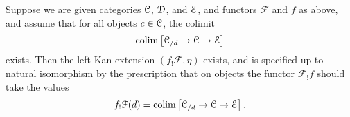 \documentclass[main.tex]{subfiles}
\begin{document}
\begin{proposition}
  Suppose we are given categories $\mathcal{C}$, $\mathcal{D}$, and $\mathcal{E}$, and functors $\mathcal{F}$ and $f$ as above, and assume that for all objects $c \in \mathcal{C}$, the colimit
  \begin{equation*}
    \operatorname*{colim}\left[ \mathcal{C}_{/d} \to \mathcal{C} \to \mathcal{E} \right]
  \end{equation*}
  exists. Then the left Kan extension $(f_{!}\mathcal{F}, \eta)$ exists, and is specified up to natural isomorphism by the prescription that on objects the functor $\mathcal{F}_{!}f$ should take the values
  \begin{equation*}
    f_{!}\mathcal{F}(d) = \operatorname*{colim} \left[ \mathcal{C}_{/d} \to \mathcal{C} \to \mathcal{E} \right].
  \end{equation*}
\end{proposition}
\end{document}
